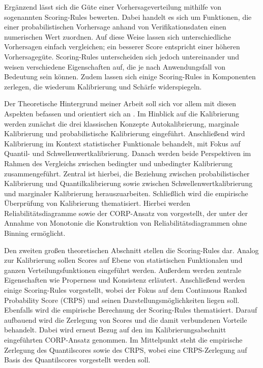 \documentclass{article}
\numberwithin{equation}{section}
\begin{document}
Ergänzend lässt sich die Güte einer Vorhersageverteilung mithilfe von sogenannten Scoring-Rules bewerten. Dabei handelt es sich um Funktionen, die einer probabilistischen Vorhersage anhand von Verifikationsdaten einen numerischen Wert zuordnen. Auf diese Weise lassen sich unterschiedliche Vorhersagen einfach vergleichen; ein besserer Score entspricht einer höheren Vorhersagegüte. Scoring-Rules unterscheiden sich jedoch untereinander und weisen verschiedene Eigenschaften auf, die je nach Anwendungsfall von Bedeutung sein können. Zudem lassen sich einige Scoring-Rules in Komponenten zerlegen, die wiederum Kalibrierung und Schärfe widerspiegeln.

Der Theoretische Hintergrund meiner Arbeit soll sich vor allem mit diesen Aspekten befassen und orientiert sich an \textcite{gneiting_regression_2023}. Im Hinblick auf die Kalibrierung werden zunächst die drei klassischen Konzepte Autokalibrierung, marginale Kalibrierung und probabilistische Kalibrierung eingeführt. Anschließend wird Kalibrierung im Kontext statistischer Funktionale behandelt, mit Fokus auf Quantil- und Schwellenwertkalibrierung. Danach werden beide Perspektiven im Rahmen des Vergleichs zwischen bedingter und unbedingter Kalibrierung zusammengeführt. Zentral ist hierbei, die Beziehung zwischen probabilistischer Kalibrierung und Quantilkalibrierung sowie zwischen Schwellenwertkalibrierung und marginaler Kalibrierung herauszuarbeiten. Schließlich wird die empirische Überprüfung von Kalibrierung thematisiert. Hierbei werden Reliabilitätsdiagramme sowie der CORP-Ansatz von \textcite{gneiting_regression_2023} vorgestellt, der unter der Annahme von Monotonie die Konstruktion von Reliabilitätsdiagrammen ohne Binning ermöglicht.

Den zweiten großen theoretischen Abschnitt stellen die Scoring-Rules dar. Analog zur Kalibrierung sollen Scores auf Ebene von statistischen Funktionalen und ganzen Verteilungsfunktionen eingeführt werden.  Außerdem  werden zentrale Eigenschaften wie Properness und Konsistenz erläutert. Anschließend werden einige Scoring-Rules vorgestellt, wobei der Fokus auf dem Continuous Ranked Probability Score (CRPS) und seinen Darstellungsmöglichkeiten liegen soll. Ebenfalls wird die empirische Berechnung der Scoring-Rules thematisiert. Darauf aufbauend wird die Zerlegung von Scores und die damit verbundenen Vorteile behandelt. Dabei wird erneut Bezug auf den im Kalibrierungsabschnitt eingeführten CORP-Ansatz genommen. Im Mittelpunkt steht die empirische Zerlegung des Quantilscores sowie des CRPS, wobei eine CRPS-Zerlegung auf Basis des Quantilscores vorgestellt werden soll.
\end{document}
